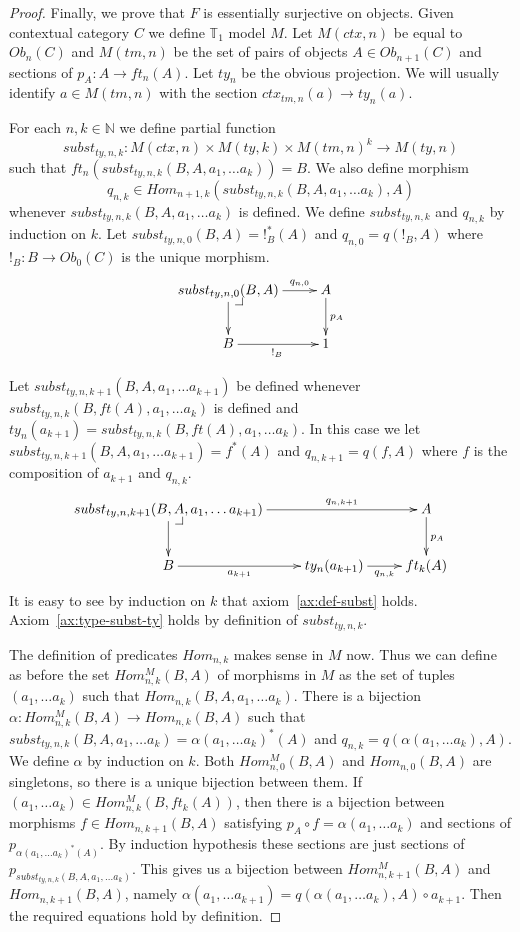 \documentclass{elsarticle}
\makeatletter
\theoremstyle{definition}
\theoremstyle{remark}
\numberwithin{figure}{section}
\newcommand{\pb}[1][dr]{\save*!/#1-1.2pc/#1:(-1,1)@^{|-}\restore}
\makeatother
\begin{document}
\begin{proof}
Finally, we prove that $F$ is essentially surjective on objects.
Given contextual category $C$ we define $\mathbb{T}_1$ model $M$.
Let $M(ctx,n)$ be equal to $Ob_n(C)$ and $M(tm,n)$ be the set of pairs of objects $A \in Ob_{n+1}(C)$ and sections of $p_A : A \to ft_n(A)$.
Let $ty_n$ be the obvious projection.
We will usually identify $a \in M(tm,n)$ with the section $ctx_{tm,n}(a) \to ty_n(a)$.

For each $n,k \in \mathbb{N}$ we define partial function
\[ subst_{ty,n,k} : M(ctx,n) \times M(ty,k) \times M(tm,n)^k \to M(ty,n) \]
such that $ft_n(subst_{ty,n,k}(B, A, a_1, \ldots a_k)) = B$.
We also define morphism
\[ q_{n,k} \in Hom_{n+1,k}(subst_{ty,n,k}(B, A, a_1, \ldots a_k), A) \]
whenever $subst_{ty,n,k}(B, A, a_1, \ldots a_k)$ is defined.
We define $subst_{ty,n,k}$ and $q_{n,k}$ by induction on $k$.
Let $subst_{ty,n,0}(B,A) = !_B^*(A)$ and $q_{n,0} = q(!_B,A)$ where $!_B : B \to Ob_0(C)$ is the unique morphism.
\[ \xymatrix{ subst_{ty,n,0}(B,A) \ar[r]^-{q_{n,0}} \ar[d] \pb & A \ar[d]^{p_A} \\
              B \ar[r]_{!_B} & 1
            } \]

Let $subst_{ty,n,k+1}(B, A, a_1, \ldots a_{k+1})$ be defined whenever $subst_{ty,n,k}(B, ft(A), \allowbreak a_1, \ldots a_k)$ is defined
    and $ty_n(a_{k+1}) = subst_{ty,n,k}(B, ft(A), a_1, \ldots a_k)$.
In this case we let $subst_{ty,n,k+1}(B, A, a_1, \ldots a_{k+1}) = f^*(A)$ and $q_{n,k+1} = q(f,A)$ where $f$ is the composition of $a_{k+1}$ and $q_{n,k}$.
\[ \xymatrix{ subst_{ty,n,k+1}(B, A, a_1, \ldots a_{k+1}) \ar[rr]^-{q_{n,k+1}} \ar[d] \pb & & A \ar[d]^{p_A} \\
              B \ar[r]_-{a_{k+1}} & ty_n(a_{k+1}) \ar[r]_-{q_{n,k}} & ft_k(A)
            } \]
It is easy to see by induction on $k$ that axiom~\eqref{ax:def-subst} holds.
Axiom~\eqref{ax:type-subst-ty} holds by definition of $subst_{ty,n,k}$.

The definition of predicates $Hom_{n,k}$ makes sense in $M$ now.
Thus we can define as before the set $Hom^M_{n,k}(B,A)$ of morphisms in $M$ as the set of tuples $(a_1, \ldots a_k)$ such that $Hom_{n,k}(B, A, a_1, \ldots a_k)$.
There is a bijection $\alpha : Hom^M_{n,k}(B,A) \to Hom_{n,k}(B,A)$ such that
    $subst_{ty,n,k}(B, A, a_1, \ldots a_k) = \alpha(a_1, \ldots a_k)^*(A)$ and $q_{n,k} = q(\alpha(a_1, \ldots a_k), A)$.
We define $\alpha$ by induction on $k$.
Both $Hom^M_{n,0}(B,A)$ and $Hom_{n,0}(B,A)$ are singletons, so there is a unique bijection between them.
If $(a_1, \ldots a_k) \in Hom^M_{n,k}(B,ft_k(A))$, then there is a bijection between morphisms $f \in Hom_{n,k+1}(B,A)$
    satisfying $p_A \circ f = \alpha(a_1, \ldots a_k)$ and sections of $p_{\alpha(a_1, \ldots a_k)^*(A)}$.
By induction hypothesis these sections are just sections of $p_{subst_{ty,n,k}(B, A, a_1, \ldots a_k)}$.
This gives us a bijection between $Hom^M_{n,k+1}(B,A)$ and $Hom_{n,k+1}(B,A)$, namely $\alpha(a_1, \ldots a_{k+1}) = q(\alpha(a_1, \ldots a_k), \allowbreak A) \circ a_{k+1}$.
Then the required equations hold by definition.


\end{proof}
\end{document}
